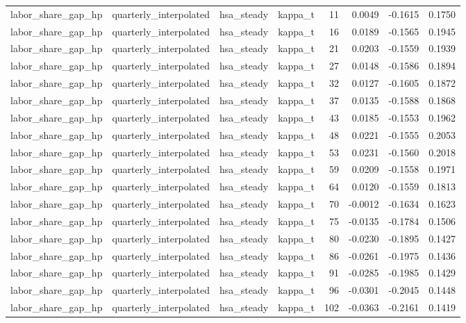 \begin{tabular}{llllrrrr}
labor\_share\_gap\_hp & quarterly\_interpolated & hsa\_steady & kappa\_t & 11 & 0.0049 & -0.1615 & 0.1750 \\
labor\_share\_gap\_hp & quarterly\_interpolated & hsa\_steady & kappa\_t & 16 & 0.0189 & -0.1565 & 0.1945 \\
labor\_share\_gap\_hp & quarterly\_interpolated & hsa\_steady & kappa\_t & 21 & 0.0203 & -0.1559 & 0.1939 \\
labor\_share\_gap\_hp & quarterly\_interpolated & hsa\_steady & kappa\_t & 27 & 0.0148 & -0.1586 & 0.1894 \\
labor\_share\_gap\_hp & quarterly\_interpolated & hsa\_steady & kappa\_t & 32 & 0.0127 & -0.1605 & 0.1872 \\
labor\_share\_gap\_hp & quarterly\_interpolated & hsa\_steady & kappa\_t & 37 & 0.0135 & -0.1588 & 0.1868 \\
labor\_share\_gap\_hp & quarterly\_interpolated & hsa\_steady & kappa\_t & 43 & 0.0185 & -0.1553 & 0.1962 \\
labor\_share\_gap\_hp & quarterly\_interpolated & hsa\_steady & kappa\_t & 48 & 0.0221 & -0.1555 & 0.2053 \\
labor\_share\_gap\_hp & quarterly\_interpolated & hsa\_steady & kappa\_t & 53 & 0.0231 & -0.1560 & 0.2018 \\
labor\_share\_gap\_hp & quarterly\_interpolated & hsa\_steady & kappa\_t & 59 & 0.0209 & -0.1558 & 0.1971 \\
labor\_share\_gap\_hp & quarterly\_interpolated & hsa\_steady & kappa\_t & 64 & 0.0120 & -0.1559 & 0.1813 \\
labor\_share\_gap\_hp & quarterly\_interpolated & hsa\_steady & kappa\_t & 70 & -0.0012 & -0.1634 & 0.1623 \\
labor\_share\_gap\_hp & quarterly\_interpolated & hsa\_steady & kappa\_t & 75 & -0.0135 & -0.1784 & 0.1506 \\
labor\_share\_gap\_hp & quarterly\_interpolated & hsa\_steady & kappa\_t & 80 & -0.0230 & -0.1895 & 0.1427 \\
labor\_share\_gap\_hp & quarterly\_interpolated & hsa\_steady & kappa\_t & 86 & -0.0261 & -0.1975 & 0.1436 \\
labor\_share\_gap\_hp & quarterly\_interpolated & hsa\_steady & kappa\_t & 91 & -0.0285 & -0.1985 & 0.1429 \\
labor\_share\_gap\_hp & quarterly\_interpolated & hsa\_steady & kappa\_t & 96 & -0.0301 & -0.2045 & 0.1448 \\
labor\_share\_gap\_hp & quarterly\_interpolated & hsa\_steady & kappa\_t & 102 & -0.0363 & -0.2161 & 0.1419 \\

\end{tabular}
